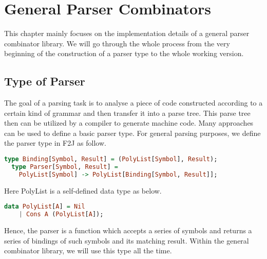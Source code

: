\chapter{General Parser Combinators}
This chapter mainly focuses on the implementation details of a general parser combinator library. We will go through the whole process from the very beginning of the construction of a parser type to the whole working version.

\section{Type of Parser}
The goal of a parsing task is to analyse a piece of code constructed according to a certain kind of grammar and then transfer it into a parse tree. This parse tree then can be utilized by a compiler to generate machine code. Many approaches can be used to define a basic parser type. For general parsing purposes, we define the parser type in F2J as follow.
\begin{singlespace}
\begin{lstlisting}[language=Haskell,basicstyle=\small]
  type Binding[Symbol, Result] = (PolyList[Symbol], Result);
  type Parser[Symbol, Result] = 
	PolyList[Symbol] -> PolyList[Binding[Symbol, Result]];
\end{lstlisting}
\end{singlespace}
Here PolyList is a self-defined data type as below.
\begin{singlespace}
\begin{lstlisting}[language=Haskell,basicstyle=\small]
  data PolyList[A] = Nil
	| Cons A (PolyList[A]);
\end{lstlisting}
\end{singlespace}
Hence, the parser is a function which accepts a series of symbols and returns a series of bindings of such symbols and its matching result. Within the general combinator library, we will use this type all the time.


